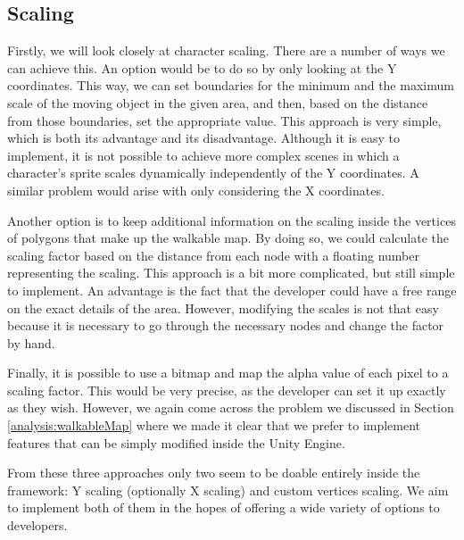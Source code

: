 \subsection{Scaling}
\label{analysis:depth:scaling}
Firstly, we will look closely at character scaling. There are a number of ways we can achieve this. An option would be to do so by only looking at the Y coordinates. This way, we can set boundaries for the minimum and the maximum scale of the moving object in the given area, and then, based on the distance from those boundaries, set the appropriate value. This approach is very simple, which is both its advantage and its disadvantage. Although it is easy to implement, it is not possible to achieve more complex scenes in which a character's sprite scales dynamically independently of the Y coordinates. A similar problem would arise with only considering the X coordinates.

Another option is to keep additional information on the scaling inside the vertices of polygons that make up the walkable map. By doing so, we could calculate the scaling factor based on the distance from each node with a floating number representing the scaling. This approach is a bit more complicated, but still simple to implement. An advantage is the fact that the developer could have a free range on the exact details of the area. However, modifying the scales is not that easy because it is necessary to go through the necessary nodes and change the factor by hand.

Finally, it is possible to use a bitmap and map the alpha value of each pixel to a scaling factor. This would be very precise, as the developer can set it up exactly as they wish. However, we again come across the problem we discussed in Section \ref{analysis:walkableMap} where we made it clear that we prefer to implement features that can be simply modified inside the Unity Engine.

From these three approaches only two seem to be doable entirely inside the framework: Y scaling (optionally X scaling) and custom vertices scaling. We aim to implement both of them in the hopes of offering a wide variety of options to developers.

